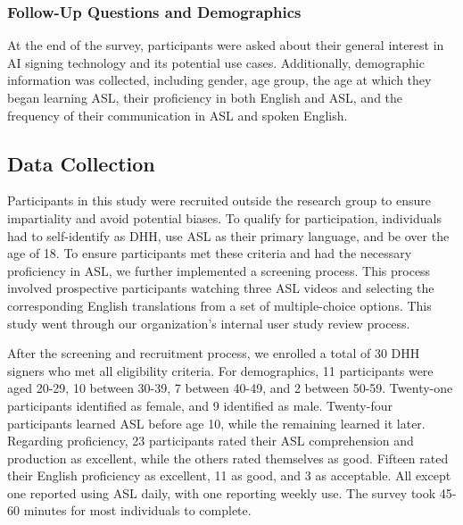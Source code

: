 
\subsubsection{Follow-Up Questions and Demographics}\label{subsubsec:sec4} At the end of the survey, participants were asked about their general interest in AI signing technology and its potential use cases. Additionally, demographic information was collected, including gender, age group, the age at which they began learning ASL, their proficiency in both English and ASL, and the frequency of their communication in ASL and spoken English.

\subsection{Data Collection}\label{subsec:data_collection}

Participants in this study were recruited outside the research group to ensure impartiality and avoid potential biases. To qualify for participation, individuals had to self-identify as DHH, use ASL as their primary language, and be over the age of 18. To ensure participants met these criteria and had the necessary proficiency in ASL, we further implemented a screening process. This process involved prospective participants watching three ASL videos and selecting the corresponding English translations from a set of multiple-choice options. This study went through our organization's internal user study review process.

After the screening and recruitment process, we enrolled a total of 30 DHH signers who met all eligibility criteria. For demographics, 11 participants were aged 20-29, 10 between 30-39, 7 between 40-49, and 2 between 50-59. Twenty-one participants identified as female, and 9 identified as male. Twenty-four participants learned ASL before age 10, while the remaining learned it later. Regarding proficiency, 23 participants rated their ASL comprehension and production as excellent, while the others rated themselves as good. Fifteen rated their English proficiency as excellent, 11 as good, and 3 as acceptable. All except one reported using ASL daily, with one reporting weekly use. The survey took 45-60 minutes for most individuals to complete.

